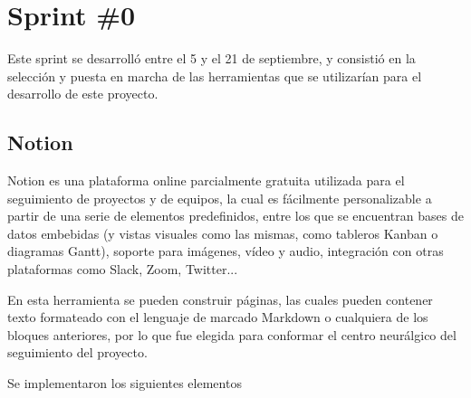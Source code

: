     \section{Sprint \#0}
        Este sprint se desarrolló entre el 5 y el 21 de septiembre, y consistió en la selección y puesta en marcha de las herramientas que se utilizarían para el desarrollo de este proyecto.
        
        \subsection{Notion}
            Notion es una plataforma online parcialmente gratuita utilizada para el seguimiento de proyectos y de equipos, la cual es fácilmente personalizable a partir de una serie de elementos predefinidos, entre los que se encuentran bases de datos embebidas (y vistas visuales como las mismas, como tableros Kanban o diagramas Gantt), soporte para imágenes, vídeo y audio, integración con otras plataformas como Slack, Zoom, Twitter...
            
            En esta herramienta se pueden construir páginas, las cuales pueden contener texto formateado con el lenguaje de marcado Markdown o cualquiera de los bloques anteriores, por lo que fue elegida para conformar el centro neurálgico del seguimiento del proyecto.
            
            Se implementaron los siguientes elementos
            
